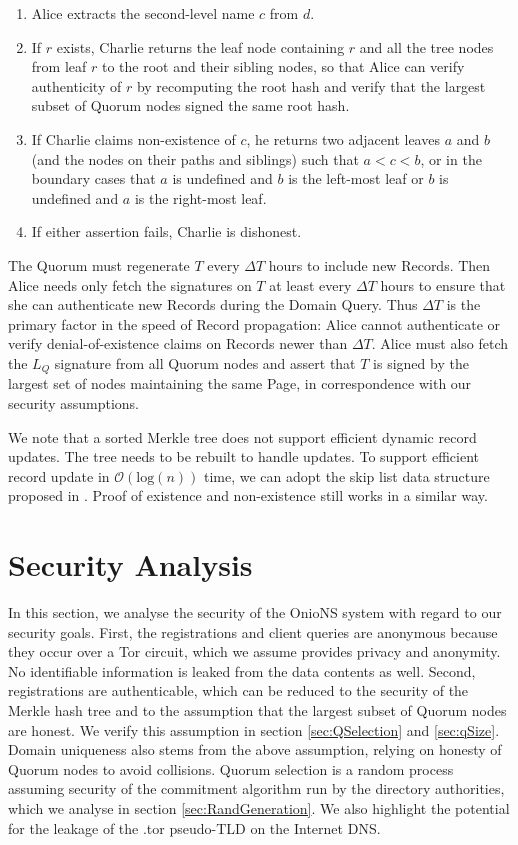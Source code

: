 \documentclass[conference]{IEEEtran}
\begin{document}
\begin{enumerate}
	\item Alice extracts the second-level name $ c $ from $ d $.
	\item If $ r $ exists, Charlie returns the leaf node containing $ r $ and all the tree nodes from leaf $ r $ to the root and their sibling nodes, so that Alice can verify authenticity of $ r $ by recomputing the root hash and verify that the largest subset of Quorum nodes signed the same root hash.
	\item If Charlie claims non-existence of $ c $, he returns two adjacent leaves $ a $ and $ b $ (and the nodes on their paths and siblings) such that $ a < c < b $, or in the boundary cases that $ a $ is undefined and $ b $ is the left-most leaf or $ b $ is undefined and $ a $ is the right-most leaf.
	\item If either assertion fails, Charlie is dishonest.
\end{enumerate}

The Quorum must regenerate $ T $ every $ \Delta T $ hours to include new Records. Then Alice needs only fetch the signatures on $ T $ at least every $ \Delta T $ hours to ensure that she can authenticate new Records during the Domain Query. Thus $ \Delta T $ is the primary factor in the speed of Record propagation: Alice cannot authenticate or verify denial-of-existence claims on Records newer than $ \Delta T $. Alice must also fetch the $ L_{Q} $ signature from all Quorum nodes and assert that $ T $ is signed by the largest set of nodes maintaining the same Page, in correspondence with our security assumptions.

We note that a sorted Merkle tree does not support efficient dynamic record updates. The tree needs to be rebuilt to handle updates. To support efficient record update in $ \mathcal{O}(\mathrm{log}(n)) $ time, we can adopt the skip list data structure proposed in \cite{goodrich2001implementation}. Proof of existence and non-existence still works in a similar way.

\section{Security Analysis}
\label{sec:Analysis}

In this section, we analyse the security of the OnioNS system with regard to our security goals. First, the registrations and client queries are anonymous because they occur over a Tor circuit, which we assume provides privacy and anonymity. No identifiable information is leaked from the data contents as well. Second, registrations are authenticable, which can be reduced to the security of the Merkle hash tree and to the assumption that the largest subset of Quorum nodes are honest. We verify this assumption in section \ref{sec:QSelection} and \ref{sec:qSize}. Domain uniqueness also stems from the above assumption, relying on honesty of Quorum nodes to avoid collisions. Quorum selection is a random process assuming security of the commitment algorithm run by the directory authorities, which we analyse in section \ref{sec:RandGeneration}. We also highlight the potential for the leakage of the .tor pseudo-TLD on the Internet DNS.
\end{document}
